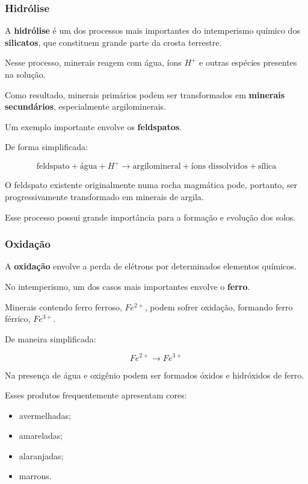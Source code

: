 \documentclass[a4paper,12pt]{article}
\theoremstyle{definition}
\theoremstyle{definition}
\theoremstyle{definition}
\begin{document}
\subsubsection{Hidrólise}

A \textbf{hidrólise} é um dos processos mais importantes do intemperismo químico dos \textbf{silicatos}, que constituem grande parte da crosta terrestre.

Nesse processo, minerais reagem com água, íons \(H^+\) e outras espécies presentes na solução.

Como resultado, minerais primários podem ser transformados em \textbf{minerais secundários}, especialmente argilominerais.

Um exemplo importante envolve os \textbf{feldspatos}.

De forma simplificada:

\[
\text{feldspato}
+
\text{água}
+
H^+
\rightarrow
\text{argilomineral}
+
\text{íons dissolvidos}
+
\text{sílica}
\]

O feldspato existente originalmente numa rocha magmática pode, portanto, ser progressivamente transformado em minerais de argila.

Esse processo possui grande importância para a formação e evolução dos solos.

\subsubsection{Oxidação}

A \textbf{oxidação} envolve a perda de elétrons por determinados elementos químicos.

No intemperismo, um dos casos mais importantes envolve o \textbf{ferro}.

Minerais contendo ferro ferroso, \(Fe^{2+}\), podem sofrer oxidação, formando ferro férrico, \(Fe^{3+}\).

De maneira simplificada:

\[
Fe^{2+}
\rightarrow
Fe^{3+}
\]

Na presença de água e oxigênio podem ser formados óxidos e hidróxidos de ferro.

Esses produtos frequentemente apresentam cores:

\begin{itemize}
    \item avermelhadas;
    \item amareladas;
    \item alaranjadas;
    \item marrons.
\end{itemize}
\end{document}
